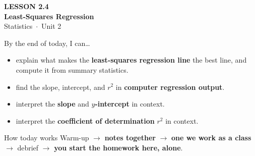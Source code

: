 \documentclass[aspectratio=169, 11pt]{beamer}
\begin{document}
{
\begin{frame}[plain]
  \vspace{2.8cm}\hspace{0.55cm}%
  \begin{minipage}{0.9\textwidth}
    {\color{goldacc}\bfseries\small LESSON 2.4}\\[0.5cm]
    {\color{white}\bfseries\LARGE Least-Squares Regression}\\[1.2cm]
    {\color{skymid}\small Statistics~$\cdot$~Unit 2}
  \end{minipage}
\end{frame}
}

\newcommand{\redink}[1]{{\color{redacc}\bfseries #1}}

\begin{frame}[t, plain]
  By the end of today, I can\ldots
  \begin{itemize}\setlength{\itemsep}{5pt}
    \item explain what makes the \textbf{least-squares regression line} the best line, and
          compute it from summary statistics.
    \item find the slope, intercept, and $r^2$ in \textbf{computer regression output}.
    \item interpret the \textbf{slope} and \textbf{$y$-intercept} in context.
    \item interpret the \textbf{coefficient of determination} $r^2$ in context.
  \end{itemize}
  \begin{block}{How today works}
    Warm-up $\to$ \textbf{notes together} $\to$ \textbf{one we work as a class} $\to$
    debrief $\to$ \textbf{you start the homework here, alone}.
  \end{block}
\end{frame}
\end{document}
